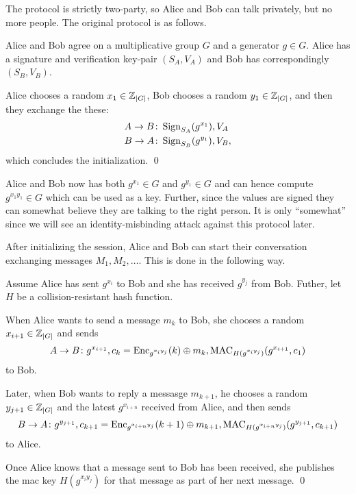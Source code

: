 The protocol is strictly two-party, so Alice and Bob can talk privately, but no 
more people.
The original protocol \cite{otr2004} is as follows.

\begin{protocol}\label{proto:otr1init}
  Alice and Bob agree on a multiplicative group \(G\) and a generator \(g\in 
  G\).
  Alice has a signature and verification key-pair \((S_A, V_A)\) and Bob has 
  correspondingly \((S_B, V_B)\).

  Alice chooses a random \(x_1\in \operatorname{\mathbb Z}_{|G|}\),
  Bob chooses a random \(y_1\in \operatorname{\mathbb Z}_{|G|}\),
  and then they exchange the these:
  \begin{align*}
    A\to B&\colon \operatorname{\mathrm{Sign}}_{S_A}( g^{x_1} ), V_A \\
    B\to A&\colon \operatorname{\mathrm{Sign}}_{S_B}( g^{y_1} ), V_B,
  \end{align*}
  which concludes the initialization.
  \qed
\end{protocol}

Alice and Bob now has both \(g^{x_1}\in G\) and \(g^{y_1}\in G\) and can hence 
compute \(g^{x_1 y_1}\in G\) which can be used as a key.
Further, since the values are signed they can somewhat believe they are talking 
to the right person.
It is only \enquote{somewhat} since we will see an identity-misbinding attack 
against this protocol later.

After initializing the session, Alice and Bob can start their conversation 
exchanging messages \(M_1, M_2, \ldots\).
This is done in the following way.

\begin{protocol}\label{proto:otr1comm}
  Assume Alice has sent \(g^{x_i}\) to Bob and she has received \(g^{y_j}\) 
  from Bob.
  Futher, let \(H\) be a collision-resistant hash function.

  When Alice wants to send a message \(m_k\) to Bob, she chooses a random 
  \(x_{i+1}\in\operatorname{\mathbb Z}_{|G|}\) and sends
  \begin{equation*}
    A\to B\colon g^{x_{i+1}},
      c_k = \operatorname{\mathrm{Enc}}_{g^{x_i y_j}}( k )\oplus m_k,
      \operatorname{\mathrm{MAC}}_{H( g^{x_i y_j} )}( g^{x_{i+1}}, c_1 )
  \end{equation*}
  to Bob.

  Later, when Bob wants to reply a messasge \(m_{k+1}\), he chooses a random 
  \(y_{j+1}\in\operatorname{\mathbb Z}_{|G|}\) and the latest \(g^{x_{i+n}}\) received from Alice, 
  and then sends
  \begin{equation*}
    B\to A\colon g^{y_{j+1}},
    c_{k+1} = \operatorname{\mathrm{Enc}}_{g^{x_{i+n} y_j}}( k+1 )\oplus m_{k+1},
    \operatorname{\mathrm{MAC}}_{H( g^{x_{i+n} y_j} )}( g^{y_{j+1}}, c_{k+1} )
  \end{equation*}
  to Alice.

  Once Alice knows that a message sent to Bob has been received, she publishes 
  the \ac{mac} key \( H( g^{x_i y_j} ) \) for that message as part of her next 
  message.
  \qed
\end{protocol}


